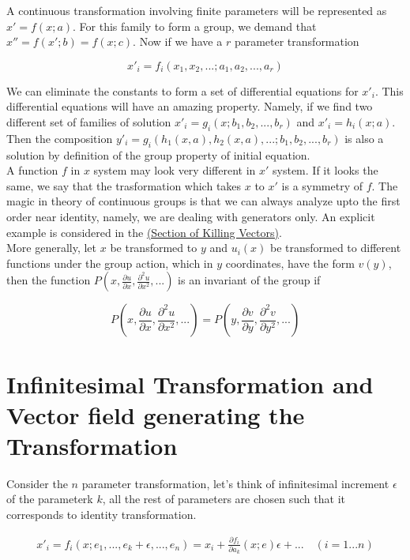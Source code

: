 \documentclass{report}
\begin{document}
\noindent A continuous transformation involving finite parameters will be represented as $x' = f(x;a)$. For this family to form a group, we demand that $x'' = f(x'; b) = f(x;c)$. Now if we have a $r$ parameter transformation 

$$x'_i = f_i(x_1,x_2,...; a_1,a_2,...,a_r)$$

\noindent We can eliminate the constants to form a set of differential equations for $x'_i$. This differential equations will have an amazing property. Namely, if we find two different set of families of solution $x'_i = g_i(x;b_1,b_2,...,b_r)$ and $x'_i = h_i(x;a)$. Then the composition $y'_i = g_i(h_1(x,a), h_2(x,a),...;b_1,b_2,...,b_r)$ is also a solution by definition of the group property of initial equation.\\

\noindent A function $f$ in $x$ system may look very different in $x'$ system. If it looks the same, we say that the trasformation which takes $x$ to $x'$ is a symmetry of $f$. The magic in theory of continuous groups is that we can always analyze upto the first order near identity, namely, we are dealing with generators only. An explicit example is considered in the \hyperref[sec:killing]{(Section of Killing Vectors)}.\\

\noindent More generally, let $x$ be transformed to $y$ and $u_i(x)$ be transformed to different functions under the group action, which in $y$ coordinates, have the form $v(y)$, then the function $P(x,\frac{\partial u}{\partial x}, \frac{\partial ^2 u}{\partial x^2},...)$ is an invariant of the group if 

$$ P\left(x,\frac{\partial u}{\partial x}, \frac{\partial ^2 u}{\partial x^2},...\right) = P\left(y,\frac{\partial v}{\partial y}, \frac{\partial ^2 v}{\partial y^2},...\right)$$

\section{Infinitesimal Transformation and Vector field generating the Transformation}

Consider the $n$ parameter transformation, let's think of infinitesimal increment $\epsilon$ of the parameterk $k$, all the rest of parameters are chosen such that it corresponds to identity transformation.

\begin{align}
x'_i = f_i(x;e_1,...,e_k+\epsilon,...,e_n)
= x_i + \frac{\partial f_i}{\partial a_k} (x;e)\epsilon + ... \quad(i = 1...n)
\end{align}
\end{document}
